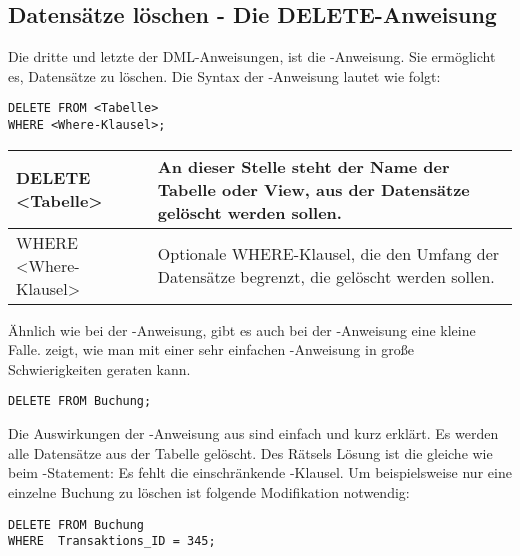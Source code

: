       \subsection{Datens\"atze l\"oschen - Die DELETE-Anweisung}
        Die dritte und letzte der DML-Anweisungen, ist die \DELETE-Anweisung.
        Sie erm\"oglicht es, Datens\"atze zu l\"oschen. Die Syntax der
        \DELETE-Anweisung lautet wie folgt:
        \begin{lstlisting}[language=oracle_sql,caption={Die \DELETE-Anweisung},label=sql07_19]
DELETE FROM <Tabelle>
WHERE <Where-Klausel>;
        \end{lstlisting}
        \begin{center}
          \label{deletesyntax}
          \begin{small}
            \tabletail{
              \hline
            }
            \begin{supertabular}{|l|p{10.8cm}|}
              DELETE <Tabelle> & An dieser Stelle steht der Name der Tabelle
              oder View, aus der Datens\"atze gel\"oscht werden sollen. \\
              \hline
              WHERE <Where-Klausel> & Optionale WHERE-Klausel, die den Umfang
              der Datens\"atze begrenzt, die gel\"oscht werden sollen. \\
            \end{supertabular}
          \end{small}
        \end{center}
        \"Ahnlich wie bei der \UPDATE-Anweisung, gibt es auch bei der
        \DELETE-Anweisung eine kleine Falle.  zeigt, wie man
        mit einer sehr einfachen \DELETE-Anweisung in gro\ss{}e Schwierigkeiten
        geraten kann.
        \begin{lstlisting}[language=oracle_sql,caption={Eine t\"odliche \DELETE-Anweisung},label=sql07_20]
DELETE FROM Buchung;
        \end{lstlisting}
        Die Auswirkungen der \DELETE-Anweisung aus  sind
        einfach und kurz erkl\"art. Es werden alle Datens\"atze aus der Tabelle
         gel\"oscht. Des R\"atsels L\"osung ist die gleiche
        wie beim \UPDATE-Statement: Es fehlt die einschr\"ankende
        \WHERE-Klausel. Um beispielsweise nur eine einzelne Buchung zu l\"oschen
        ist folgende Modifikation notwendig:
        \begin{lstlisting}[language=oracle_sql,caption={Schon viel besser!!!},label=sql07_21]
DELETE FROM Buchung
WHERE  Transaktions_ID = 345;
        \end{lstlisting}
